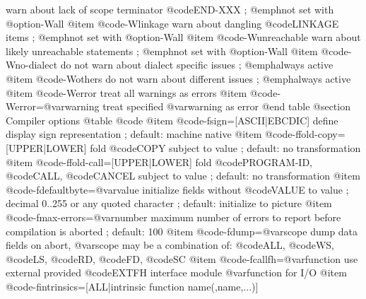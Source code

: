 warn about lack of scope terminator @code{END-XXX}
; @emph{not set with @option{-Wall}}
@item @code{-Wlinkage}
warn about dangling @code{LINKAGE} items
; @emph{not set with @option{-Wall}}
@item @code{-Wunreachable}
warn about likely unreachable statements
; @emph{not set with @option{-Wall}}
@item @code{-Wno-dialect}
do not warn about dialect specific issues
; @emph{always active}
@item @code{-Wothers}
do not warn about different issues
; @emph{always active}
@item @code{-Werror}
treat all warnings as errors
@item @code{-Werror=@var{warning}}
treat specified @var{warning} as error
@end table
@section Compiler options
@table @code
@item @code{-fsign=[ASCII|EBCDIC]}
define display sign representation
; default: machine native
@item @code{-ffold-copy=[UPPER|LOWER]}
fold @code{COPY} subject to value
; default: no transformation
@item @code{-ffold-call=[UPPER|LOWER]}
fold @code{PROGRAM-ID}, @code{CALL}, @code{CANCEL} subject to value
; default: no transformation
@item @code{-fdefaultbyte=@var{value}}
initialize fields without @code{VALUE} to value
; decimal 0..255 or any quoted character
; default: initialize to picture
@item @code{-fmax-errors=@var{number}}
maximum number of errors to report before
compilation is aborted
; default: 100
@item @code{-fdump=@var{scope}}
dump data fields on abort, @var{scope} may be
a combination of: @code{ALL}, @code{WS}, @code{LS}, @code{RD}, @code{FD}, @code{SC}
@item @code{-fcallfh=@var{function}}
use external provided @code{EXTFH} interface module
@var{function} for I/O
@item @code{-fintrinsics=[ALL|intrinsic function name(,name,...)]}

